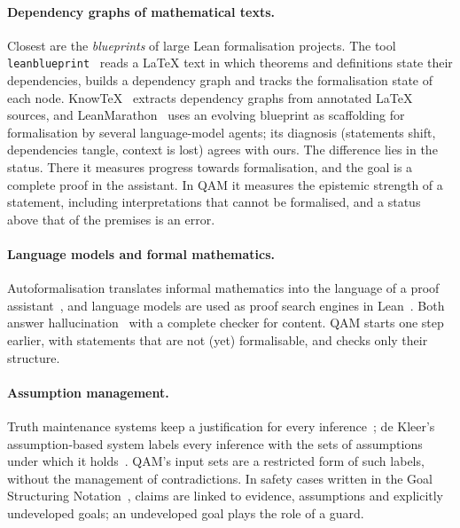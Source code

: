 \paragraph{Dependency graphs of mathematical texts.} Closest are the \emph{blueprints} of large Lean formalisation projects. The tool
\texttt{leanblueprint}~\cite{blueprint} reads a \LaTeX{} text in which theorems and definitions state their dependencies, builds a
dependency graph and tracks the formalisation state of each node. KnowTeX~\cite{knowtex} extracts dependency graphs from annotated
\LaTeX{} sources, and LeanMarathon~\cite{leanmarathon} uses an evolving blueprint as scaffolding for formalisation by several
language-model agents; its diagnosis (statements shift, dependencies tangle, context is lost) agrees with ours. The difference lies in the
status. There it measures progress towards formalisation, and the goal is a complete proof in the assistant. In QAM it measures the
epistemic strength of a statement, including interpretations that cannot be formalised, and a status above that of the premises is an
error.

\paragraph{Language models and formal mathematics.} Autoformalisation translates informal mathematics into the language of a proof
assistant~\cite{autoformal}, and language models are used as proof search engines in Lean~\cite{leandojo}. Both answer
hallucination~\cite{halluc} with a complete checker for content. QAM starts one step earlier, with statements that are not (yet)
formalisable, and checks only their structure.

\paragraph{Assumption management.} Truth maintenance systems keep a justification for every inference~\cite{doyle79}; de Kleer's
assumption-based system labels every inference with the sets of assumptions under which it holds~\cite{atms}. QAM's input sets are a
restricted form of such labels, without the management of contradictions. In safety cases written in the Goal Structuring
Notation~\cite{gsn}, claims are linked to evidence, assumptions and explicitly undeveloped goals; an undeveloped goal plays the role of
a guard.

